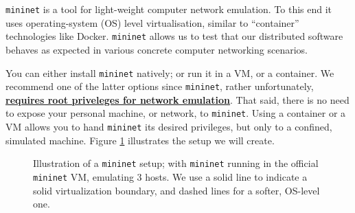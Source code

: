 \documentclass{article}
\newcommand{\mininet}{\texttt{mininet}}
\begin{document}
\maketitle

\mininet{} is a tool for light-weight computer network emulation. To
this end it uses operating-system (OS) level virtualisation, similar
to ``container'' technologies like Docker. \mininet{} allows us to
test that our distributed software behaves as expected in various
concrete computer networking scenarios.

You can either install \mininet{} natively; or run it in a VM, or a
container. We recommend one of the latter options since \mininet{},
rather unfortunately, \underline{\textbf{requires root priveleges for
network emulation}}. That said, there is no need to expose your
personal machine, or network, to \mininet{}. Using a container or a VM
allows you to hand \mininet{} its desired privileges, but only to a
confined, simulated machine. Figure \ref{fig:mininet-basics}
illustrates the setup we will create.

\begin{figure}[h!]
\centering



\caption{Illustration of a \mininet{} setup; with \mininet{} running
in the official \mininet{} VM, emulating 3 hosts. We use a solid line
to indicate a solid virtualization boundary, and dashed lines for a
softer, OS-level one. }

\label{fig:mininet-basics}

\end{figure}
\end{document}
